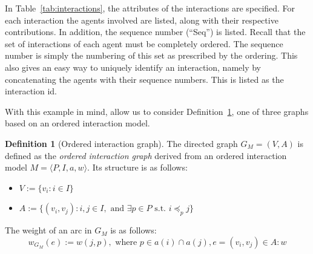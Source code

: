 \documentclass[a4paper,11pt]{book}
\theoremstyle{definition}
\newtheorem{definition}{Definition}
\begin{document}
In Table~\ref{tab:interactions}, the attributes of the interactions are specified. For each interaction the
agents involved are listed, along with their respective contributions.
In addition, the sequence number (``Seq'') is listed. Recall that the set of interactions of each agent must
be completely ordered. The sequence number is
simply the numbering of this set as prescribed by the ordering. This also gives an easy way to uniquely
identify an interaction, namely by concatenating the agents with their sequence numbers. This is listed
as the interaction id.

With this example in mind, allow us to consider Definition~\ref{def:oig}, one of three graphs based on 
an ordered interaction model.

\begin{definition}[Ordered interaction graph]
    The directed graph $G_M = (V, A)$ is defined as the \emph{ordered interaction graph}
    derived from an ordered interaction model $M =\langle P, I, a, w \rangle$.
    Its structure is as follows:
    \begin{itemize}
        \item $V := \{ v_{i} : i \in I\}$\\
        \item $A := \{ (v_{i}, v_{j}) : i, j \in I, \mbox{ and } \exists p\in P \mbox{ s.t. } i \preceq_p j \}$\\
    \end{itemize}

    The weight of an arc in $G_M$ is as follows:
    \begin{equation*}
        w_{G_M}(e) := w(j, p), \mbox{ where } p \in a(i) \cap a(j), e = (v_{i}, v_{j}) \in A:w
    \end{equation*}

    
    \label{def:oig}
\end{definition}
\end{document}
